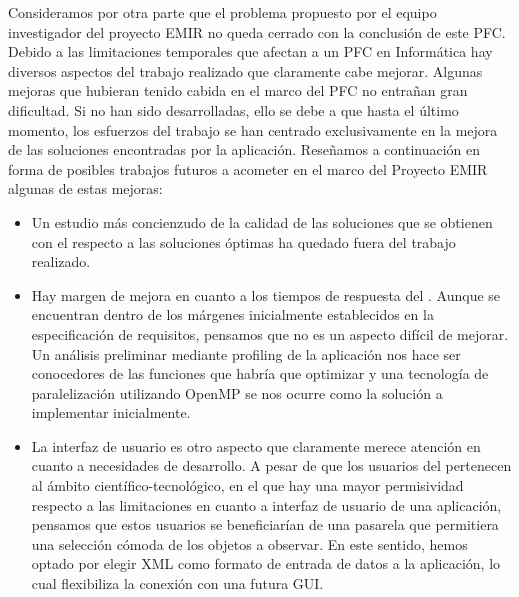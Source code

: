 Consideramos por otra parte que el problema propuesto por el equipo investigador del proyecto EMIR no queda cerrado con la
conclusión de este PFC.
Debido a las limitaciones temporales que afectan a un PFC en Informática hay diversos aspectos del trabajo realizado que
claramente cabe mejorar.
Algunas mejoras que hubieran tenido cabida en el marco del PFC no entrañan gran dificultad. 
Si no han sido desarrolladas, ello se debe a que hasta el último momento, los esfuerzos del trabajo se han centrado exclusivamente
en la mejora de las soluciones encontradas por la aplicación.
Reseñamos a continuación en forma de posibles trabajos futuros a acometer en el marco del Proyecto EMIR algunas de estas mejoras:
\begin{itemize}
\item Un estudio más concienzudo de la calidad de las soluciones que se obtienen con el \CSUO{} respecto a las soluciones óptimas
      ha quedado fuera del trabajo realizado.
\item Hay margen de mejora en cuanto a los tiempos de respuesta del \CSUO{}. 
      Aunque se encuentran dentro de los márgenes inicialmente establecidos en la especificación de requisitos, pensamos que no es un aspecto
			difícil de mejorar.
			Un análisis preliminar mediante profiling de la aplicación nos hace ser conocedores de las funciones que habría que optimizar y
			una tecnología de paralelización utilizando OpenMP se nos ocurre como la solución a implementar inicialmente.
\item La interfaz de usuario es otro aspecto que claramente merece atención en cuanto a necesidades de desarrollo.
      A pesar de que los usuarios del \CSUO{} pertenecen al ámbito científico-tecnológico, en el que hay una mayor permisividad respecto
			a las limitaciones en cuanto a interfaz de usuario de una aplicación, pensamos que estos usuarios se beneficiarían de una
			pasarela que permitiera una selección cómoda de los objetos a observar.
			En este sentido, hemos optado por elegir XML como formato de entrada de datos a la aplicación, lo cual flexibiliza la conexión con una
			futura GUI.
\end{itemize}

